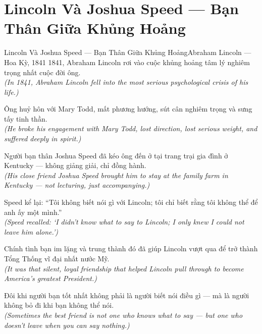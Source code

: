 \section{Lincoln Và Joshua Speed --- Bạn Thân Giữa Khủng Hoảng}
\begin{truyen}{Lincoln Và Joshua Speed --- Bạn Thân Giữa Khủng Hoảng}{Abraham Lincoln --- Hoa Kỳ, 1841}
 1841, Abraham Lincoln rơi vào cuộc khủng hoảng tâm lý nghiêm trọng nhất cuộc đời ông.\\[4pt]
\textit{(In 1841, Abraham Lincoln fell into the most serious psychological crisis of his life.)}

Ông huỷ hôn với Mary Todd, mất phương hướng, sút cân nghiêm trọng và sưng tấy tinh thần.\\[4pt]
\textit{(He broke his engagement with Mary Todd, lost direction, lost serious weight, and suffered deeply in spirit.)}

Người bạn thân Joshua Speed đã kéo ông đến ở tại trang trại gia đình ở Kentucky --- không giảng giải, chỉ đồng hành.\\[4pt]
\textit{(His close friend Joshua Speed brought him to stay at the family farm in Kentucky --- not lecturing, just accompanying.)}

Speed kể lại: ``Tôi không biết nói gì với Lincoln; tôi chỉ biết rằng tôi không thể để anh ấy một mình.''\\[4pt]
\textit{(Speed recalled: `I didn't know what to say to Lincoln; I only knew I could not leave him alone.')}

Chính tình bạn im lặng và trung thành đó đã giúp Lincoln vượt qua để trở thành Tổng Thống vĩ đại nhất nước Mỹ.\\[4pt]
\textit{(It was that silent, loyal friendship that helped Lincoln pull through to become America's greatest President.)}

\end{truyen}
\begin{baihoc}
  Đôi khi người bạn tốt nhất không phải là người biết nói điều gì --- mà là người không bỏ đi khi bạn không thể nói.\\[4pt]
  \textit{(Sometimes the best friend is not one who knows what to say --- but one who doesn't leave when you can say nothing.)}
\end{baihoc}

